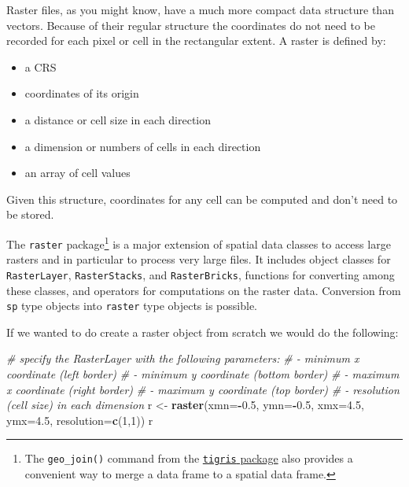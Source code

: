 \documentclass[]{book}
\newenvironment{Shaded}{\begin{snugshade}}{\end{snugshade}}
\newcommand{\KeywordTok}[1]{\textcolor[rgb]{0.13,0.29,0.53}{\textbf{#1}}}
\newcommand{\DataTypeTok}[1]{\textcolor[rgb]{0.13,0.29,0.53}{#1}}
\newcommand{\DecValTok}[1]{\textcolor[rgb]{0.00,0.00,0.81}{#1}}
\newcommand{\FloatTok}[1]{\textcolor[rgb]{0.00,0.00,0.81}{#1}}
\newcommand{\StringTok}[1]{\textcolor[rgb]{0.31,0.60,0.02}{#1}}
\newcommand{\CommentTok}[1]{\textcolor[rgb]{0.56,0.35,0.01}{\textit{#1}}}
\newcommand{\OperatorTok}[1]{\textcolor[rgb]{0.81,0.36,0.00}{\textbf{#1}}}
\newcommand{\NormalTok}[1]{#1}
\providecommand{\tightlist}{%
  \setlength{\itemsep}{0pt}\setlength{\parskip}{0pt}}
\let\rmarkdownfootnote\footnote%
\def\footnote{\protect\rmarkdownfootnote}
\theoremstyle{definition}
\theoremstyle{definition}
\theoremstyle{definition}
\theoremstyle{remark}
\begin{document}
Raster files, as you might know, have a much more compact data structure
than vectors. Because of their regular structure the coordinates do not
need to be recorded for each pixel or cell in the rectangular extent. A
raster is defined by:

\begin{itemize}
\tightlist
\item
  a CRS
\item
  coordinates of its origin
\item
  a distance or cell size in each direction
\item
  a dimension or numbers of cells in each direction
\item
  an array of cell values
\end{itemize}

Given this structure, coordinates for any cell can be computed and don't
need to be stored.

The \texttt{raster} package\footnote{The \texttt{geo\_join()} command
  from the
  \href{https://cran.r-project.org/web/packages/tigris/index.html}{\texttt{tigris}
  package} also provides a convenient way to merge a data frame to a
  spatial data frame.} is a major extension of spatial data classes to
access large rasters and in particular to process very large files. It
includes object classes for \texttt{RasterLayer}, \texttt{RasterStacks},
and \texttt{RasterBricks}, functions for converting among these classes,
and operators for computations on the raster data. Conversion from
\texttt{sp} type objects into \texttt{raster} type objects is possible.

If we wanted to do create a raster object from scratch we would do the
following:

\begin{Shaded}
\begin{Highlighting}[]
\CommentTok{# specify the RasterLayer with the following parameters:}
\CommentTok{# - minimum x coordinate (left border)}
\CommentTok{# - minimum y coordinate (bottom border)}
\CommentTok{# - maximum x coordinate (right border)}
\CommentTok{# - maximum y coordinate (top border)}
\CommentTok{# - resolution (cell size) in each dimension}
\NormalTok{r <-}\StringTok{ }\KeywordTok{raster}\NormalTok{(}\DataTypeTok{xmn=}\OperatorTok{-}\FloatTok{0.5}\NormalTok{, }\DataTypeTok{ymn=}\OperatorTok{-}\FloatTok{0.5}\NormalTok{, }\DataTypeTok{xmx=}\FloatTok{4.5}\NormalTok{, }\DataTypeTok{ymx=}\FloatTok{4.5}\NormalTok{, }\DataTypeTok{resolution=}\KeywordTok{c}\NormalTok{(}\DecValTok{1}\NormalTok{,}\DecValTok{1}\NormalTok{))}
\NormalTok{r}
\end{Highlighting}
\end{Shaded}
\end{document}
